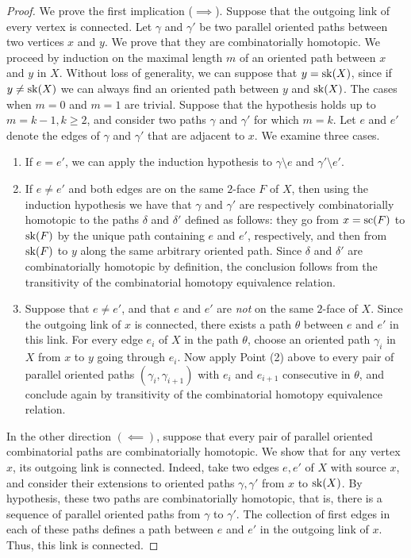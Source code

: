 \begin{proof}
    We prove the first implication ($\implies$). 
    Suppose that the outgoing link of every vertex is connected. 
    Let $\gamma$ and $\gamma'$ be two parallel oriented paths between two vertices $x$ and $y$. 
    We prove that they are combinatorially homotopic. 
    We proceed by induction on the maximal length $m$ of an oriented path between $x$ and $y$ in $X$. 
    Without loss of generality, we can suppose that $y=\mathrm{sk}(X)$, since if $y\neq\mathrm{sk}(X)$ we can always find an oriented path between $y$ and $\mathrm{sk}(X)$.
    The cases when $m=0$ and $m=1$ are trivial. 
    Suppose that the hypothesis holds up to $m=k-1, k\geq 2$, and consider two paths $\gamma$ and $\gamma'$ for which $m=k$. 
    Let $e$ and $e'$ denote the edges of $\gamma$ and $\gamma'$ that are adjacent to $x$. 
    We examine three cases.
    \begin{enumerate}
        \item If $e=e'$, we can apply the induction hypothesis to $\gamma \setminus e$ and $\gamma' \setminus e'$. 
        \item If $e \neq e'$ and both edges are on the same $2$-face $F$ of $X$, then using the induction hypothesis we have that $\gamma$ and $\gamma'$ are respectively combinatorially homotopic to the paths $\delta$ and $\delta'$ defined as follows: they go from $x=\mathrm{sc}(F)$ to $\mathrm{sk}(F)$ by the unique path containing $e$ and $e'$, respectively, and then from $\mathrm{sk}(F)$ to $y$ along the same arbitrary oriented path. 
        Since $\delta$ and $\delta'$ are combinatorially homotopic by definition, the conclusion follows from the transitivity of the combinatorial homotopy equivalence relation. 
        \item Suppose that $e\neq e'$, and that $e$ and $e'$ are \emph{not} on the same $2$-face of $X$. 
        Since the outgoing link of $x$ is connected, there exists a path $\theta$ between $e$ and $e'$ in this link. 
        For every edge $e_i$ of $X$ in the path $\theta$, choose an oriented path $\gamma_i$ in $X$ from $x$ to $y$ going through $e_i$. 
        Now apply Point (2) above to every pair of parallel oriented paths $(\gamma_i, \gamma_{i+1})$ with $e_i$ and $e_{i+1}$ consecutive in $\theta$, and conclude again by transitivity of the combinatorial homotopy equivalence relation. 
    \end{enumerate}

    In the other direction $(\impliedby)$, suppose that every pair of parallel oriented combinatorial paths are combinatorially homotopic. 
    We show that for any vertex $x$, its outgoing link is connected. 
    Indeed, take two edges $e,e'$ of $X$ with source $x$, and consider their extensions to oriented paths $\gamma, \gamma'$ from $x$ to $\mathrm{sk}(X)$. 
    By hypothesis, these two paths are combinatorially homotopic, that is, there is a sequence of parallel oriented paths from $\gamma$ to $\gamma'$. 
    The collection of first edges in each of these paths defines a path between $e$ and $e'$ in the outgoing link of $x$. 
    Thus, this link is connected. 
\end{proof}

